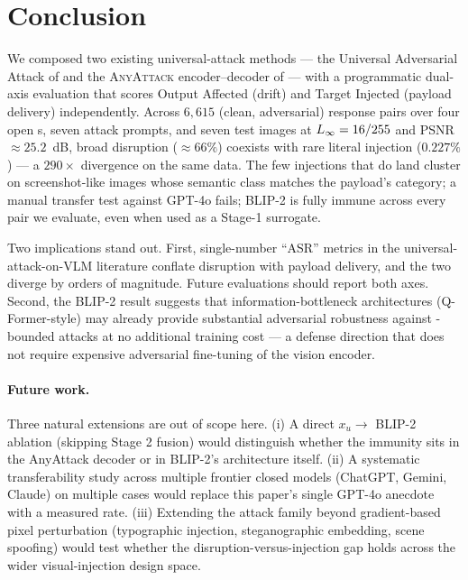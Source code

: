 \section{Conclusion}
\label{sec:conclusion}

We composed two existing universal-attack methods --- the Universal Adversarial Attack of \citet{rahmatullaev2025universal} and the \textsc{AnyAttack} encoder--decoder of \citet{zhang2025anyattack} --- with a programmatic dual-axis evaluation that scores Output Affected (drift) and Target Injected (payload delivery) independently. Across $6{,}615$ (clean, adversarial) response pairs over four open \vlm{}s, seven attack prompts, and seven test images at $L_{\infty} = 16/255$ and PSNR $\approx 25.2$~dB, broad disruption ($\approx 66\%$) coexists with rare literal injection ($0.227\%$) --- a $290\times$ divergence on the same data. The few injections that do land cluster on screenshot-like images whose semantic class matches the payload's category; a manual transfer test against GPT-4o fails; BLIP-2 is fully immune across every pair we evaluate, even when used as a Stage-1 surrogate.

Two implications stand out. First, single-number ``ASR'' metrics in the universal-attack-on-VLM literature conflate disruption with payload delivery, and the two diverge by orders of magnitude. Future evaluations should report both axes. Second, the BLIP-2 result suggests that information-bottleneck architectures (Q-Former-style) may already provide substantial adversarial robustness against \eps{}-bounded attacks at no additional training cost --- a defense direction that does not require expensive adversarial fine-tuning of the vision encoder.

\paragraph{Future work.}
Three natural extensions are out of scope here. (i) A direct $x_u \to$ BLIP-2 ablation (skipping Stage 2 fusion) would distinguish whether the immunity sits in the AnyAttack decoder or in BLIP-2's architecture itself. (ii) A systematic transferability study across multiple frontier closed models (ChatGPT, Gemini, Claude) on multiple cases would replace this paper's single GPT-4o anecdote with a measured rate. (iii) Extending the attack family beyond gradient-based pixel perturbation (typographic injection, steganographic embedding, scene spoofing) would test whether the disruption-versus-injection gap holds across the wider visual-injection design space.

